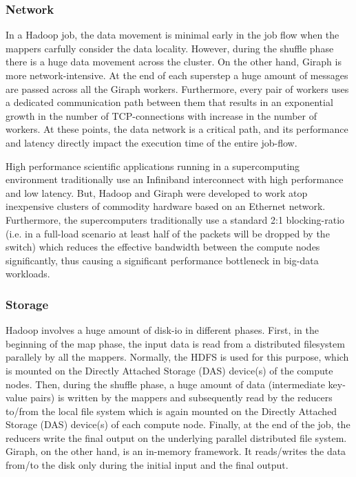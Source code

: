 \documentclass[conference]{IEEEtran}
\begin{document}
\subsubsection {Network}
In a Hadoop job, the data movement is minimal early in the job flow when the mappers carfully consider the data locality. 
However, during the shuffle phase there is a huge data movement across the cluster. 
On the other hand,  Giraph is more network-intensive. 
At the end of each superstep a huge amount of messages are passed across all the Giraph workers.
Furthermore, every pair of workers uses a dedicated communication path between them that results in an exponential growth in the number of TCP-connections with increase in the number of workers.
At these points, the data network is a critical path, and its performance and latency directly impact the execution time of the entire job-flow.

High performance scientific applications running in a supercomputing environment traditionally use an Infiniband interconnect with high performance and low latency.
But, Hadoop and Giraph were developed to work atop inexpensive clusters of commodity hardware based on an Ethernet network.
Furthermore, the supercomputers traditionally use a standard 2:1 blocking-ratio (i.e. in a full-load scenario at least half of the packets will be dropped by the switch) which reduces the effective bandwidth between the compute nodes significantly, thus causing a significant performance bottleneck in big-data workloads.

\subsubsection {Storage}
Hadoop involves a huge amount of disk-io in different phases.
First, in the beginning of the map phase, the input data is read from a distributed filesystem parallely by all the mappers.
Normally, the HDFS is used for this purpose, which is mounted on the Directly Attached Storage (DAS) device(s) of the compute nodes. 
Then, during the shuffle phase, a huge amount of data (intermediate key-value pairs) is written by the mappers and subsequently read by the reducers to/from the local file system which is again mounted on the Directly Attached Storage (DAS) device(s) of each compute node.
Finally, at the end of the job, the reducers write the final output on the underlying parallel distributed file system.
Giraph, on the other hand, is an in-memory framework. It reads/writes the data from/to the disk only during the initial input and the final output.
\end{document}
